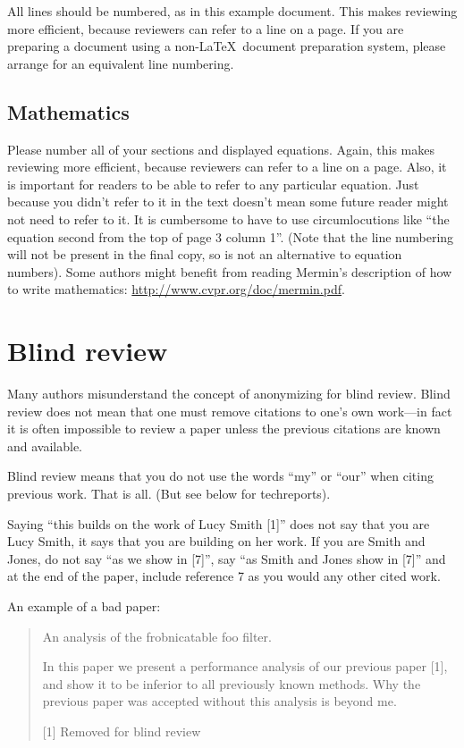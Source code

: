 \documentclass[runningheads]{llncs}
\begin{document}
All lines should be numbered, as in this example document.  This makes
reviewing more efficient, because reviewers can refer to a line on a
page.  If you are preparing a document using a non-\LaTeX\
document preparation system, please arrange for an equivalent line numbering.

\subsection{Mathematics}

Please number all of your sections and displayed equations.  Again,
this makes reviewing more efficient, because reviewers can refer to a
line on a page.  Also, it is important for readers to be able to refer
to any particular equation.  Just because you didn't refer to it in
the text doesn't mean some future reader might not need to refer to
it.  It is cumbersome to have to use circumlocutions like ``the
equation second from the top of page 3 column 1''.  (Note that the
line numbering will not be present in the final copy, so is not an
alternative to equation numbers).  Some authors might benefit from
reading Mermin's description of how to write mathematics:
\url{http://www.cvpr.org/doc/mermin.pdf}.


\section{Blind review}
\label{sec:blind}

Many authors misunderstand the concept of anonymizing for blind
review.  Blind review does not mean that one must remove
citations to one's own work---in fact it is often impossible to
review a paper unless the previous citations are known and
available.

Blind review means that you do not use the words ``my'' or ``our''
when citing previous work.  That is all.  (But see below for 
techreports).

Saying ``this builds on the work of Lucy Smith [1]'' does not say
that you are Lucy Smith, it says that you are building on her
work.  If you are Smith and Jones, do not say ``as we show in
[7]'', say ``as Smith and Jones show in [7]'' and at the end of the
paper, include reference 7 as you would any other cited work.

An example of a bad paper:
\begin{quote}
\begin{center}
    An analysis of the frobnicatable foo filter. 
\end{center}
\vspace{0.5em}
   
   In this paper we present a performance analysis of our
   previous paper [1], and show it to be inferior to all
   previously known methods.  Why the previous paper was
   accepted without this analysis is beyond me.
   
   [1] Removed for blind review
\end{quote}
   
\end{document}
